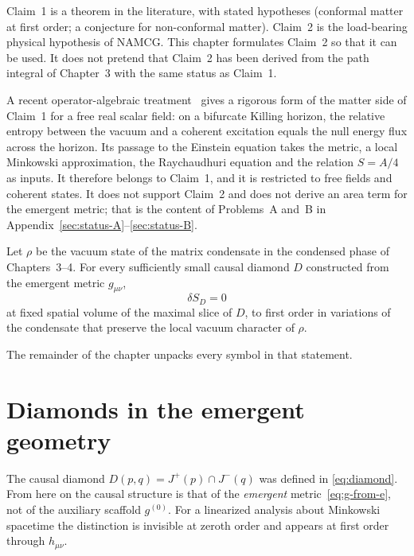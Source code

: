 Claim~1 is a theorem in the literature, with stated hypotheses
(conformal matter at first order; a conjecture for non-conformal
matter). Claim~2 is the load-bearing physical hypothesis of NAMCG.
This chapter formulates Claim~2 so that it can be used. It does not
pretend that Claim~2 has been derived from the path integral of
Chapter~3 with the same status as Claim~1.

A recent operator-algebraic treatment~\cite{DorauMuch2026} gives a
rigorous form of the matter side of Claim~1 for a free real scalar
field: on a bifurcate Killing horizon, the relative entropy between
the vacuum and a coherent excitation equals the null energy flux
across the horizon. Its passage to the Einstein equation takes the
metric, a local Minkowski approximation, the Raychaudhuri equation
and the relation \(S=A/4\) as inputs. It therefore belongs to
Claim~1, and it is restricted to free fields and coherent states. It
does not support Claim~2 and does not derive an area term for the
emergent metric; that is the content of Problems~A and~B in
Appendix~\ref{sec:status-A}--\ref{sec:status-B}.

\begin{assumption}
  \label{ass:EE}
  Let \(\rho\) be the vacuum state of the matrix condensate in the
  condensed phase of Chapters~3--4. For every sufficiently small
  causal diamond \(D\) constructed from the emergent metric
  \(g_{\mu\nu}\),
  \begin{equation}
    \label{eq:EE}
    \delta S_D=0
  \end{equation}
  at fixed spatial volume of the maximal slice of \(D\), to first
  order in variations of the condensate that preserve the local
  vacuum character of \(\rho\).
\end{assumption}

The remainder of the chapter unpacks every symbol in that statement.

\section{Diamonds in the emergent geometry}
\label{sec:ch6-diamonds}

The causal diamond \(D(p,q)=J^+(p)\cap J^-(q)\) was defined in
\eqref{eq:diamond}. From here on the causal structure is that of the
\emph{emergent} metric~\eqref{eq:g-from-e}, not of the auxiliary
scaffold \(g^{(0)}\). For a linearized analysis about Minkowski
spacetime the distinction is invisible at zeroth order and appears
at first order through \(h_{\mu\nu}\).

